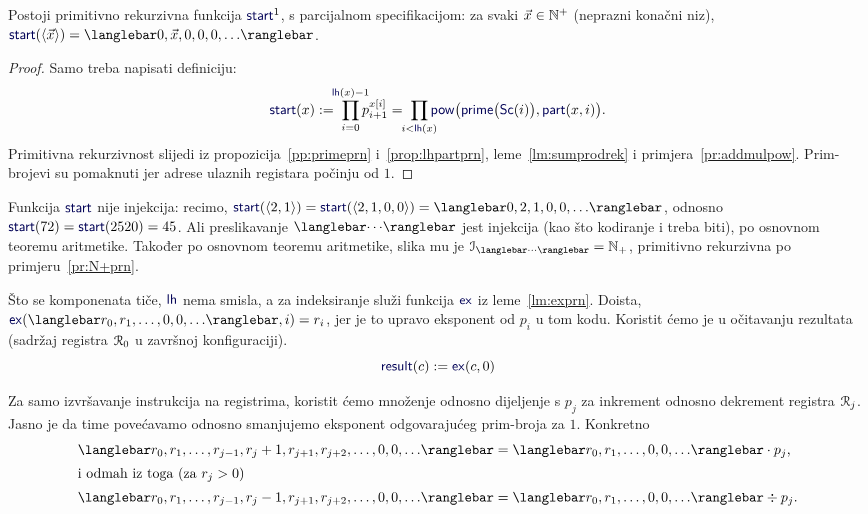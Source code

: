 \begin{lema}[{name=[primitivna rekurzivnost generatora početne konfiguracije]}]\label{lm:startprn}
    Postoji primitivno rekurzivna funkcija $\f{start}^1$\!, s parcijalnom specifikacijom: za svaki $\vec x\in{\mathbb N}^+$ (neprazni konačni niz), $\f{start}(\langle\vec x\rangle)=\knk{0,\vec x,0,0,0,\dotsc}$.
\end{lema}
\begin{proof}
Samo treba napisati definiciju:
\begin{equation}
    \f{start}(x):=\;\prod_{i=0}^{\mathclap{\f{lh}(x)-1}}p_{i+1}^{x[i]}=\;\prod_{\mathclap{i<\f{lh}(x)}}\f{pow}\bigl(\f{prime}\bigl(\f{Sc}(i)\bigr),\f{part}(x,i)\bigr)\text.
\end{equation}
Primitivna rekurzivnost slijedi iz propozicija~\ref{pp:primeprn} i~\ref{prop:lhpartprn}, leme~\ref{lm:sumprodrek} i primjera~\ref{pr:addmulpow}. Prim-brojevi su pomaknuti jer adrese ulaznih registara počinju od $1$.
\end{proof}

Funkcija $\f{start}$ nije injekcija: recimo, $\f{start}(\langle2,1\rangle)=\f{start}(\langle2,1,0,0\rangle)=\knk{0,2,1,0,0,\dotsc}$, odnosno $\f{start}(72)=\f{start}(2520)=45$. Ali preslikavanje $\knk{\cdots}$ jest injekcija (kao što kodiranje i treba biti), po osnovnom teoremu aritmetike. Također po osnovnom teoremu aritmetike, slika mu je $\im{\knk{\cdots}}=\N_+$, primitivno rekurzivna po primjeru~\ref{pr:N+prn}.

Što se komponenata tiče, $\f{lh}$ nema smisla, a za indeksiranje služi funkcija $\f{ex}$ iz leme~\ref{lm:exprn}. Doista, $\f{ex}(\knk{r_0,r_1,\dotsc,0,0,\dotsc},i)=r_i$, jer je to upravo eksponent od $p_i$ u tom kodu. Koristit ćemo je u očitavanju rezultata (sadržaj registra $\mathcal R_{0}$ u završnoj konfiguraciji).
\begin{equation}\label{eq:resultdef}
    \f{result}(c):=\f{ex}(c,0)
\end{equation}

Za samo izvršavanje instrukcija na registrima, koristit ćemo množenje odnosno dijeljenje s $p_j$ za inkrement odnosno dekrement registra $\mathcal R_{j}$. Jasno je da time povećavamo odnosno smanjujemo eksponent odgovarajućeg prim-broja za $1$. Konkretno
\begin{align}
\label{eq:knkppj}\knk{r_0,r_1,\dotsc,r_{j-1},r_j+1,r_{j+1},r_{j+2},\dotsc,0,0,\dotsc}
&=
\knk{r_0,r_1,\dotsc,0,0,\dotsc}\cdot p_j\text,
    \\\intertext{i odmah iz toga (za $r_j>0$)}
\label{eq:knkkpj}\knk{r_0,r_1,\dotsc,r_{j-1},r_j-1,r_{j+1},r_{j+2},\dotsc,0,0,\dotsc}
&=
\knk{r_0,r_1,\dotsc,0,0,\dotsc}\div p_j\text.
\end{align}

